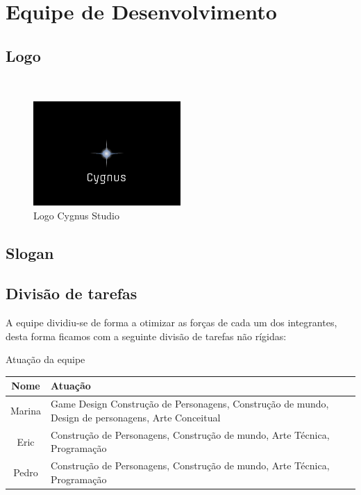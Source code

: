 \section{Equipe de Desenvolvimento}

\subsection{Logo}

~

\begin{figure}[!htb] \caption{\label{fig_logo}Logo Cygnus Studio} \begin{center}
\includegraphics[width=0.5\textwidth]{imagens/logo.png}\end{center}
 \end{figure}

\subsection{Slogan}

\subsection{Divisão de tarefas}

A equipe dividiu-se de forma a
otimizar as forças de cada um dos integrantes, desta forma ficamos com a
seguinte divisão de tarefas não rígidas:

\begin{quadro}[htb] \caption{\label{quadro_atuacao}Atuação da equipe}
    \begin{tabularx}{\textwidth}{|c|X|} \hline \textbf{Nome} &
        \textbf{Atuação}\\ \hline Marina & Game Design Construção de
        Personagens, Construção de mundo, Design de personagens, Arte Conceitual
        \\ \hline Eric   & Construção de Personagens, Construção de mundo, Arte
        Técnica, Programação                                        \\ \hline
        Pedro  & Construção de Personagens, Construção de mundo, Arte Técnica,
        Programação \\ \hline \end{tabularx} 
\end{quadro}
